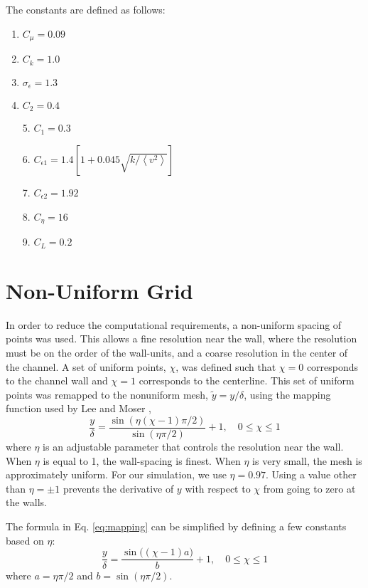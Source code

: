 \documentclass[a4paper,11pt]{article}
\newcommand{\chevron}[1]{\left\langle #1 \right\rangle}
\newcommand{\ep}{\epsilon}
\begin{document}
The constants are defined as follows: 
\begin{multicols}{2}
\begin{enumerate}
	\item $C_\mu = 0.09$
        \item $C_k = 1.0$
	\item $\sigma_\ep = 1.3$
	\item $C_2 = 0.4$	
\end{enumerate}
\columnbreak 

\begin{itemize}
	\item[5.] $C_1 = 0.3$
	\item[6.] $C_{\ep 1} = 1.4[1 + 0.045 \sqrt{k/\chevron{v^2}}]$
	\item[7.] $C_{\ep 2} = 1.92$  
	\item[8.] $C_\eta = 16$
	\item[9.] $C_L = 0.2$
\end{itemize}
\end{multicols}

\section{Non-Uniform Grid}
In order to reduce the computational requirements, a non-uniform spacing of points was used.  This allows a fine resolution near the wall, where the resolution must be on the order of the wall-units, and a coarse resolution in the center of the channel.  A set of uniform points, $\chi$, was defined such that $\chi=0$ corresponds to the channel wall and $\chi=1$ corresponds to the centerline.  This set of uniform points was remapped to the nonuniform mesh, $\tilde{y} = y/\delta$, using the mapping function used by Lee and Moser \cite{Lee},
\begin{equation} \label{eq:mapping}
 \frac{y}{\delta} = \frac{\sin(\eta (\chi-1) \pi/2)}{\sin(\eta \pi/2)}+1, \quad 0 \le \chi \le 1
\end{equation}
where $\eta$ is an adjustable parameter that controls the resolution near the wall. When $\eta$ is equal to 1, the wall-spacing is finest.  When $\eta$ is very small, the mesh is approximately uniform.  For our simulation, we use $\eta = 0.97$.  Using a value other than $\eta = \pm 1$ prevents the derivative of $y$ with respect to $\chi$ from going to zero at the walls.

The formula in Eq. \ref{eq:mapping} can be simplified by defining a few constants based on $\eta$:
\begin{equation}
 \frac{y}{\delta} = \frac{\sin\big((\chi-1)a\big)}{b}+1, \quad 0 \le \chi \le 1
\end{equation}
where $a = \eta \pi/2$ and $b = \sin (\eta \pi/2)$.
\end{document}
